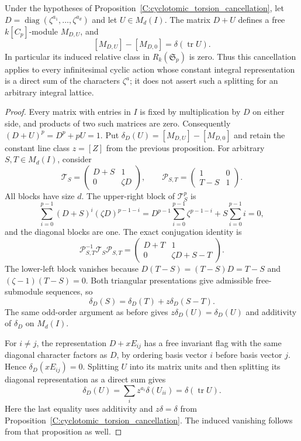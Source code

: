 \begin{proposition}
\label{C:cyclotomic_matrix_cancellation}
Under the hypotheses of Proposition~\ref{C:cyclotomic_torsion_cancellation},
let $D=\operatorname{diag}(\zeta^{a_1},\ldots,\zeta^{a_d})$
and let $U\in M_d(I)$. The matrix $D+U$ defines a free
$k[C_p]$-module $M_{D,U}$, and
\[
 [M_{D,U}]-[M_{D,0}]=\delta(\operatorname{tr}U).
\]
In particular its induced relative class in $R_k(\mathfrak S_p)$
is zero. Thus this cancellation applies to every infinitesimal
cyclic action whose constant integral representation is a direct
sum of the characters $\zeta^a$; it does not assert such a
splitting for an arbitrary integral lattice.
\end{proposition}
\begin{proof}
Every matrix with entries in $I$ is fixed by multiplication by
$D$ on either side, and products of two such matrices are zero.
Consequently $(D+U)^p=D^p+pU=1$.
Put $\delta_D(U)=[M_{D,U}]-[M_{D,0}]$ and retain the constant
line class $z=[Z]$ from the previous proposition.
For arbitrary $S,T\in M_d(I)$, consider
\[
 \mathcal T_S=\begin{pmatrix}D+S&1\\0&\zeta D\end{pmatrix},
 \qquad
 \mathcal P_{S,T}=\begin{pmatrix}1&0\\T-S&1\end{pmatrix}.
\]
All blocks have size $d$. The upper-right block of
$\mathcal T_S^p$ is
\[
 \sum_{i=0}^{p-1}(D+S)^i(\zeta D)^{p-1-i}
 =D^{p-1}\sum_{i=0}^{p-1}\zeta^{p-1-i}
        +S\sum_{i=0}^{p-1}i=0,
\]
and the diagonal blocks are one. The exact conjugation identity is
\[
 \mathcal P_{S,T}^{-1}\mathcal T_S\mathcal P_{S,T}
 =\begin{pmatrix}D+T&1\\0&\zeta D+S-T\end{pmatrix}.
\]
The lower-left block vanishes because $D(T-S)=(T-S)D=T-S$
and $(\zeta-1)(T-S)=0$. Both triangular presentations give
admissible free-submodule sequences, so
\[
 \delta_D(S)=\delta_D(T)+z\delta_D(S-T).
\]
The same odd-order argument as before gives
$z\delta_D(U)=\delta_D(U)$ and additivity of $\delta_D$ on
$M_d(I)$.

For $i\ne j$, the representation $D+xE_{ij}$ has a free invariant
flag with the same diagonal character factors as $D$, by ordering
basis vector $i$ before basis vector $j$. Hence
$\delta_D(xE_{ij})=0$.
Splitting $U$ into its matrix units and then splitting its diagonal
representation as a direct sum gives
\[
 \delta_D(U)=\sum_i z^{a_i}\delta(U_{ii})
             =\delta(\operatorname{tr}U).
\]
Here the last equality uses additivity and $z\delta=\delta$
from Proposition~\ref{C:cyclotomic_torsion_cancellation}.
The induced vanishing follows from that proposition as well.
\end{proof}
